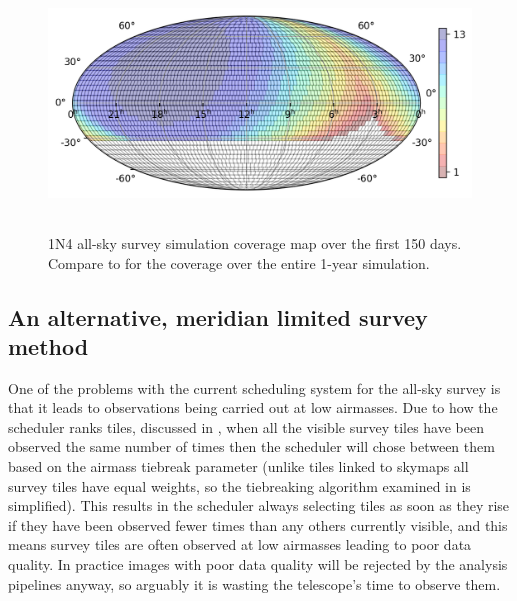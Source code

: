 \begin{colsection}
\begin{colsection}
\begin{figure}[p]
    \begin{center}
        \includegraphics[height=190pt]{images/survey_sims/150_1N4_lite.png}
    \end{center}
    \caption[1N4 survey simulation observations over 150 days]{
        1N4 all-sky survey simulation coverage map over the first 150 days. Compare to  for the coverage over the entire 1-year simulation.
    }\label{fig:survey_sim_1n4_150}
\end{figure}

\clearpage

\end{colsection}


\subsection{An alternative, meridian limited survey method}
\label{sec:survey_sim_meridian}
\begin{colsection}


One of the problems with the current scheduling system for the all-sky survey is that it leads to observations being carried out at low airmasses. Due to how the scheduler ranks tiles, discussed in , when all the visible survey tiles have been observed the same number of times then the scheduler will chose between them based on the airmass tiebreak parameter (unlike tiles linked to skymaps all survey tiles have equal weights, so the tiebreaking algorithm examined in  is simplified). This results in the scheduler always selecting tiles as soon as they rise if they have been observed fewer times than any others currently visible, and this means survey tiles are often observed at low airmasses leading to poor data quality. In practice images with poor data quality will be rejected by the analysis pipelines anyway, so arguably it is wasting the telescope's time to observe them.


\end{colsection}
\end{colsection}
